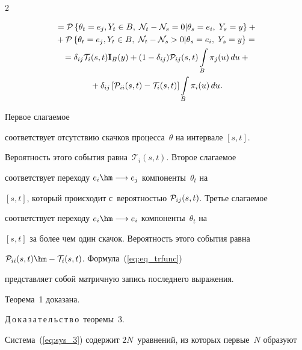 \begin{multicols}{2}
{\begin{multline*}
{}=\pp{\theta_t = e_j, Y_t \in B, \; \NII_t-\NII_s=0 | \theta_s = e_i,\;Y_s=y} + {}\\


{} +


\pp{\theta_t = e_j, Y_t \in B, \; \NII_t-\NII_s>0 | \theta_s = e_i,\;Y_s=y}={} \\ 


{}=


\delta_{ij} \mathcal{T}_i(s, t)\mathbf{I}_B(y) + (1-\delta_{ij}) 


\ppp_{ij}(s,t)\int\limits_B \pi_j(u)\,du +{}\\


{}+


\delta_{ij}\left[ \ppp_{ii}(s,t) -  \mathcal{T}_i(s, t)\right] \int\limits_B 


\pi_i(u)\,du.




\end{multline*}


Первое слагаемое


соответствует отсутствию скачков процесса~$\theta$ на интервале $[s,t]$. 


Вероятность этого события равна~$\mathcal{T}_i(s, t)$. Второе слагаемое 


соответствует переходу $e_i \hm\longrightarrow e_j $ компоненты~$\theta_t$ на 


$[s,t]$, который происходит с~вероятностью ${\mathcal P}_{ij}(s,t)$. Третье слагаемое 


соответствует переходу $e_i \hm\longrightarrow e_i $ компоненты~$\theta_t$ на 


$[s,t]$ за более чем один скачок. Вероятность этого события равна 


$\ppp_{ii}(s,t) \hm-  \mathcal{T}_i(s, t)$. Формула~(\ref{eq:eq_trfunc}) 


представляет собой матричную запись последнего выражения.


Теорема~1 доказана.








\smallskip





\noindent


Д\,о\,к\,а\,з\,а\,т\,е\,л\,ь\,с\,т\,в\,о\ теоремы~3.


Система~(\ref{eq:sys_3}) содержит $2N$~уравнений, из которых первые~$N$ образуют 


}
\end{multicols}
